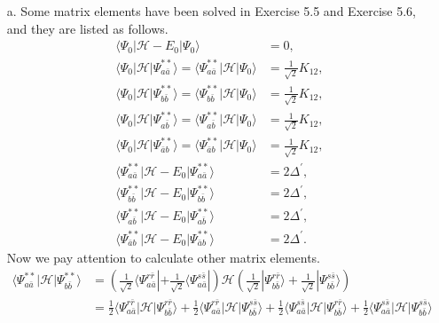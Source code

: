 \documentclass[a4paper]{book}
\newcounter{solution}[chapter]
\begin{document}
	\begin{solution}
	
	\begin{itemize}
	
	\item[a.] Some matrix elements have been solved in Exercise 5.5 and Exercise 5.6, and they are listed as follows. 
	\begin{align*}
		\langle \Psi_0 | \mathscr{H} - E_0 | \Psi_0 \rangle &= 0 , \\
		\langle \Psi_0 | \mathscr{H} | \Psi^{**}_{a\bar{a}} \rangle = \langle \Psi^{**}_{a\bar{a}} | \mathscr{H} | \Psi_0 \rangle &= \frac{1}{ \sqrt{2} } K_{12} , \\
		\langle \Psi_0 | \mathscr{H} | \Psi^{**}_{b \bar{b}} \rangle = \langle \Psi^{**}_{b \bar{b}} | \mathscr{H} | \Psi_0 \rangle &= \frac{1}{ \sqrt{2} } K_{12} , \\
		\langle \Psi_0 | \mathscr{H} | \Psi^{**}_{a\bar{b}} \rangle = \langle \Psi^{**}_{a\bar{b}} | \mathscr{H} | \Psi_0 \rangle &= \frac{1}{ \sqrt{2} } K_{12} , \\
		\langle \Psi_0 | \mathscr{H} | \Psi^{**}_{\bar{a}b}\rangle = \langle \Psi^{**}_{\bar{a}b} | \mathscr{H} | \Psi_0 \rangle &= \frac{1}{ \sqrt{2} } K_{12} , \\
		\langle \Psi^{**}_{a\bar{a}} | \mathscr{H} - E_0 | \Psi^{**}_{a\bar{a}} \rangle &= 2 \Delta^\prime , \\
		\langle \Psi^{**}_{b\bar{b}} | \mathscr{H} - E_0 | \Psi^{**}_{b\bar{b}} \rangle &= 2 \Delta^\prime , \\
		\langle \Psi^{**}_{a\bar{b}} | \mathscr{H} - E_0 | \Psi^{**}_{a\bar{b}} \rangle &= 2 \Delta^\prime , \\
		\langle \Psi^{**}_{\bar{a}b} | \mathscr{H} - E_0 | \Psi^{**}_{\bar{a}b} \rangle &= 2 \Delta^\prime .
	\end{align*}
	Now we pay attention to calculate other matrix elements.
	\begin{align*}
		\langle \Psi^{**}_{a\bar{a}} | \mathscr{H} | \Psi^{**}_{b\bar{b}} \rangle &= \left( \frac{1}{ \sqrt{2} } \langle \Psi^{ r \bar{r} }_{a \bar{a}} | + \frac{1}{ \sqrt{2} } \langle \Psi^{ s \bar{s} }_{a \bar{a}} | \right) \mathscr{H} \left( \frac{1}{ \sqrt{2} } | \Psi^{ r \bar{r} }_{b \bar{b}} \rangle + \frac{1}{ \sqrt{2} } | \Psi^{ s \bar{s} }_{b \bar{b}} \rangle \right) \\
		&= \frac{1}{2} \langle \Psi^{ r \bar{r} }_{a \bar{a}} | \mathscr{H} | \Psi^{ r \bar{r} }_{b \bar{b}} \rangle + \frac{1}{2} \langle \Psi^{ r \bar{r} }_{a \bar{a}} | \mathscr{H} | \Psi^{ s \bar{s} }_{b \bar{b}} \rangle + \frac{1}{2} \langle \Psi^{ s \bar{s} }_{a \bar{a}} | \mathscr{H} | \Psi^{ r \bar{r} }_{b \bar{b}} \rangle +  \frac{1}{2} \langle \Psi^{ s \bar{s} }_{a \bar{a}} | \mathscr{H} | \Psi^{ s \bar{s} }_{b \bar{b}} \rangle \\

\end{align*}
\end{itemize}
\end{solution}
\end{document}
